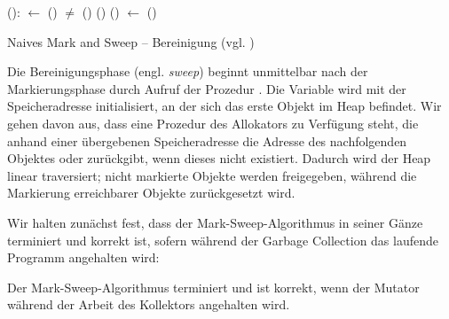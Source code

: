 \begin{algorithm}
\begin{algorithmic}[1]
	\State {}():
	\State \quad {} $\gets$ ()
	\State \quad \WHILE {} $\neq$ \Null
	\State \quad \quad \IF {}()
	\State \quad \quad \quad {}()
	\State \quad \quad \ELSE {}()
	\State \quad \quad {} $\gets$ ()
\end{algorithmic}
\caption[Naives Mark and Sweep -- Bereinigung]{Naives Mark and Sweep -- Bereinigung (vgl. \cite[Kap. 2.2]{jones-lins})}
\label{algo:naive-sweep}
\end{algorithm}

Die Bereinigungsphase (engl. \textit{sweep}) beginnt unmittelbar nach der Markierungsphase durch Aufruf der Prozedur .
Die Variable  wird mit der Speicheradresse initialisiert, an der sich das erste Objekt im Heap befindet.
Wir gehen davon aus, dass eine Prozedur  des Allokators zu Verfügung steht, die anhand einer übergebenen Speicheradresse die Adresse des nachfolgenden Objektes oder \Null zurückgibt, wenn dieses nicht existiert.
Dadurch wird der Heap linear traversiert; nicht markierte Objekte werden freigegeben, während die Markierung erreichbarer Objekte zurückgesetzt wird.

Wir halten zunächst fest, dass der Mark-Sweep-Algorithmus in seiner Gänze terminiert und korrekt ist, sofern während der Garbage Collection das laufende Programm angehalten wird:

\begin{mybox}
\begin{satz}
	\label{satz:mark-sweep-correctness}
	Der Mark-Sweep-Algorithmus terminiert und ist korrekt, wenn der Mutator während der Arbeit des Kollektors angehalten wird.
\end{satz}
\end{mybox}

